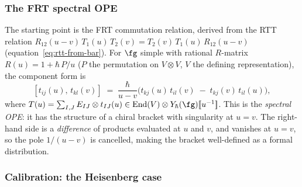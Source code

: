 \subsubsection*{The FRT spectral OPE}

The starting point is the FRT commutation relation, derived
from the RTT relation $R_{12}(u{-}v)\,T_1(u)\,T_2(v) =
T_2(v)\,T_1(u)\,R_{12}(u{-}v)$
(equation~\eqref{eq:rtt-from-bar}). For $\fg$ simple with
rational $R$-matrix $R(u) = 1 + \hbar\,P/u$ ($P$ the
permutation on $V \otimes V$, $V$ the defining representation),
the component form is
\begin{equation}\label{eq:FRT-components}
\boxed{
[t_{ij}(u),\, t_{kl}(v)]
\;=\;
\frac{\hbar}{u - v}\bigl(
 t_{kj}(u)\,t_{il}(v)
 \;-\;
 t_{kj}(v)\,t_{il}(u)
\bigr),
}
\end{equation}
where $T(u) = \sum_{I,J} E_{IJ} \otimes t_{IJ}(u) \in
\operatorname{End}(V) \otimes Y_\hbar(\fg)[\![u^{-1}]\!]$.
This is the \emph{spectral OPE}: it has the structure of a
chiral bracket with singularity at $u = v$. The right-hand
side is a \emph{difference} of products evaluated at $u$ and
$v$, and vanishes at $u = v$, so the pole $1/(u-v)$ is
cancelled, making the bracket well-defined as a formal
distribution.

\subsubsection*{Calibration: the Heisenberg case}

